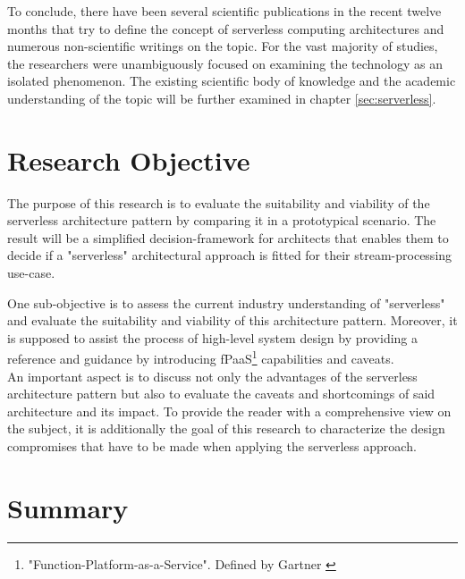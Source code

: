 To conclude, there have been several scientific publications in the recent twelve months that try to define the concept of serverless computing architectures and numerous non-scientific writings on the topic. For the vast majority of studies, the researchers were unambiguously focused on examining the technology as an isolated phenomenon. The existing scientific body of knowledge and the academic understanding of the topic will be further examined in chapter \ref{sec:serverless}.

\section{Research Objective}

The purpose of this research is to evaluate the suitability and viability of the serverless architecture pattern by comparing it in a prototypical scenario. The result will be a simplified decision-framework for architects that enables them to decide if a "serverless" architectural approach is fitted for their stream-processing use-case.

One sub-objective is to assess the current industry understanding of "serverless" and evaluate the suitability and viability of this architecture pattern.
Moreover, it is supposed to assist the process of high-level system design by providing a reference and guidance by introducing fPaaS\footnote{"Function-Platform-as-a-Service". Defined by Gartner \autocite{Chandrasekaran2017EvolutionWhen}} capabilities and caveats.\\
An important aspect is to discuss not only the advantages of the serverless architecture pattern but also to evaluate the caveats and shortcomings of said architecture and its impact. To provide the reader with a comprehensive view on the subject, it is additionally the goal of this research to characterize the design compromises that have to be made when applying the serverless approach.  

\section{Summary}

